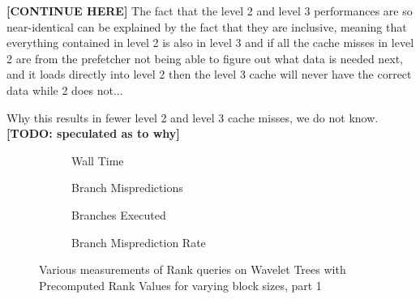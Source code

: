 \textbf{[CONTINUE HERE]}
The fact that the level 2 and level 3 performances are so near-identical can be explained by the fact that they are inclusive, meaning that everything contained in level 2 is also in level 3 and
if all the cache misses in level 2 are from the prefetcher not being able to figure out what data is needed next, and it loads directly into level 2 then the level 3 cache will never have the correct data while 2 does not...

Why this results in fewer level 2 and level 3 cache misses, we do not know.
\textbf{[TODO: speculated as to why]}






\begin{figure}\tiny

\begin{subfigure}{0.48\textwidth}
	
	\caption{Wall Time}
	\label{fig:PrecomputedRankBlockSize_Rank_WallTime}
\end{subfigure}
\hfill
\begin{subfigure}{0.48\textwidth}
	
	\caption{Branch Mispredictions}
	\label{fig:PrecomputedRankBlockSize_Rank_BranchMiss}
\end{subfigure}

\begin{subfigure}{0.48\textwidth}
	
	\caption{Branches Executed}
	\label{fig:PrecomputedRankBlockSize_Rank_BranchExe}
\end{subfigure}
\hfill	
\begin{subfigure}{0.48\textwidth}
	
	\caption{Branch Misprediction Rate}
	\label{fig:PrecomputedRankBlockSize_Rank_BranchMissRate}
\end{subfigure}
\caption{Various measurements of Rank queries on Wavelet Trees with Precomputed Rank Values for varying block sizes, part 1}
\label{fig:PrecomputedRankBlockSize_Rank}
\end{figure}


